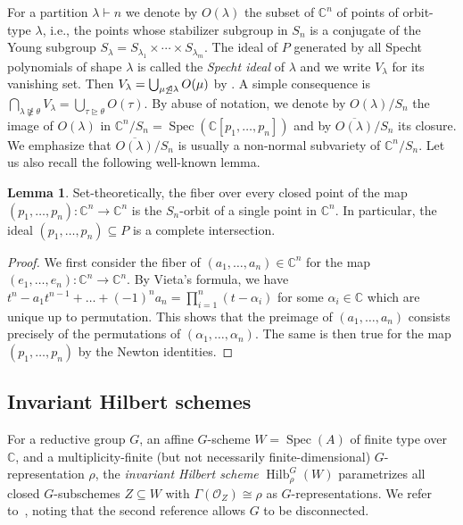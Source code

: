 \documentclass[11pt]{amsart}
\theoremstyle{definition}
\newtheorem{lemma}[theorem]{Lemma}
\newcommand{\CC}{\mathbb{C}}
\DeclareMathOperator{\Spec}{Spec}
\DeclareMathOperator{\Hilb}{Hilb}
\begin{document}
For a partition $\lambda \vdash n$ we denote by $O(\lambda)$ the subset of $\CC^n$ of points of orbit-type $\lambda$, i.e., the points whose stabilizer subgroup in $S_n$ is a conjugate of the Young subgroup $S_\lambda = S_{\lambda_1} \times \cdots \times S_{\lambda_m}$. The ideal of $P$ generated by all Specht polynomials of shape $\lambda$ is called the \emph{Specht ideal} of $\lambda$ and we write $V_\lambda$ for its vanishing set. Then $V_\lambda = \bigcup_{\mu \not \unlhd \lambda} O(\mu)$ by \cite[Corollary~1]{moustrou2021symmetric}. A simple consequence is $\bigcap_{\lambda \not \ntrianglerighteq \theta} V_\lambda = \bigcup_{\tau \trianglerighteq \theta} O(\tau)$. By abuse of notation, we denote by $O(\lambda)/S_n$ the image of $O(\lambda)$ in $\CC^n/S_n = \Spec(\CC[p_1,\ldots,p_n])$ and by $\overline{O(\lambda)}/S_n$ its closure. We emphasize that $\overline{O(\lambda)}/S_n$ is usually a non-normal subvariety of $\CC^n/S_n$.
Let us also recall the following well-known lemma.

\begin{lemma}
Set-theoretically, the fiber over every closed point of the map $(p_1,\ldots,p_n) : \CC^n \to \CC^n$ is the $S_n$-orbit of a single point in $\CC^n$. In particular, the ideal $(p_1,\ldots,p_n) \subseteq P$ is a complete intersection.
\end{lemma}

\begin{proof}
We first consider the fiber of $(a_1,\dots,a_n) \in \CC^n$ for the map $(e_1,\ldots,e_n): \CC^n \to \CC^n$. By Vieta's formula, we have $t^n - a_1 t^{n-1} + \ldots + (-1)^n a_n = \prod_{i=1}^n (t - \alpha_i)$ for some $\alpha_i \in \CC$ which are unique up to permutation. This shows that the preimage of $(a_1,\dots,a_n)$ consists precisely of the permutations of $(\alpha_1,\ldots,\alpha_n)$.
The same is then true for the map $(p_1,\ldots,p_n)$ by the Newton identities.
\end{proof}


\subsection{Invariant Hilbert schemes}
For a reductive group $G$, an affine $G$-scheme $W = \Spec(A)$ of finite type over $\CC$, and a multiplicity-finite (but not necessarily finite-dimensional) $G$-representation $\rho$, the \emph{invariant Hilbert scheme} $\Hilb_\rho^G(W)$ parametrizes all closed $G$-subschemes $Z \subseteq W$ with $\Gamma(\mathcal{O}_Z) \cong \rho$ as $G$-representations. We refer to~\cite{AlexeevBrion,BrionInvariantHilb}, noting that the second reference allows $G$ to be disconnected.
\end{document}
